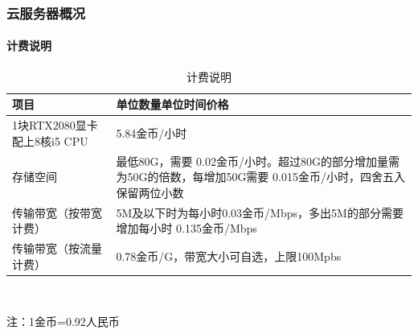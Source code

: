 \documentclass[10pt]{beamer}
\begin{document}
        \begin{frame}
            \frametitle{云服务器概况}
                \framesubtitle{计费说明}

                {\small
                \begin{table}[h]
                    {\centering
                    \caption{计费说明}
                        \begin{tabular}{|p{}|p{}|}
                            \hline
                            项目 & 单位数量单位时间价格 \\
                            \hline
                            1块RTX2080显卡配上8核i5 CPU & 5.84金币/小时 \\
                            \hline
                            存储空间 & 最低80G，需要 0.02金币/小时。超过80G的部分增加量需为50G的倍数，每增加50G需要 0.015金币/小时，四舍五入保留两位小数 \\
                            \hline
                            传输带宽（按带宽计费） & 5M及以下时为每小时0.03金币/Mbps，多出5M的部分需要增加每小时 0.135金币/Mbps \\
                            \hline
                            传输带宽（按流量计费） & 0.78金币/G，带宽大小可自选，上限100Mpbs \\
                            \hline
                        \end{tabular} \\
                    }
                \end{table}
                {\tiny \qquad \qquad 注：1金币=0.92人民币}
                }

        \end{frame}
\end{document}
